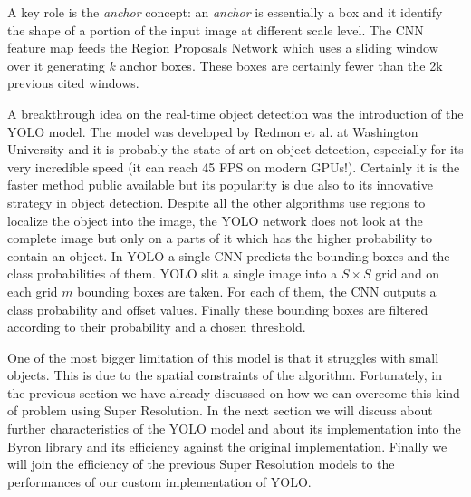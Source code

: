 \documentclass{standalone}
\begin{document}
A key role is the \emph{anchor} concept: an \emph{anchor} is essentially a box and it identify the shape of a portion of the input image at different scale level.
The CNN feature map feeds the Region Proposals Network which uses a sliding window over it generating $k$ anchor boxes.
These boxes are certainly fewer than the 2k previous cited windows.

A breakthrough idea on the real-time object detection was the introduction of the YOLO model.
The model was developed by Redmon et al. at Washington University and it is probably the state-of-art on object detection, especially for its very incredible speed (it can reach 45 FPS on modern GPUs!).
Certainly it is the faster method public available but its popularity is due also to its innovative strategy in object detection.
Despite all the other algorithms use regions to localize the object into the image, the YOLO network does not look at the complete image but only on a parts of it which has the higher probability to contain an object.
In YOLO a single CNN predicts the bounding boxes and the class probabilities of them.
YOLO slit a single image into a $S\times S$ grid and on each grid $m$ bounding boxes are taken.
For each of them, the CNN outputs a class probability and offset values.
Finally these bounding boxes are filtered according to their probability and a chosen threshold.

One of the most bigger limitation of this model is that it struggles with small objects.
This is due to the spatial constraints of the algorithm.
Fortunately, in the previous section we have already discussed on how we can overcome this kind of problem using Super Resolution.
In the next section we will discuss about further characteristics of the YOLO model and about its implementation into the \textsf{Byron} library and its efficiency against the original implementation.
Finally we will join the efficiency of the previous Super Resolution models to the performances of our custom implementation of YOLO.


\end{document}
